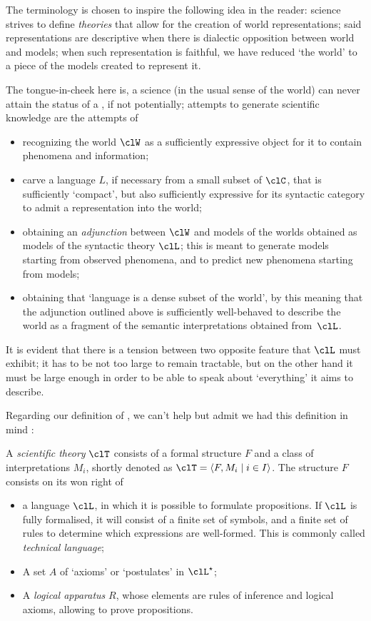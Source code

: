 \begin{remark}\label{remark_yuggoth_2}
	The terminology is chosen to inspire the following idea in the reader: science strives to define \emph{theories} that allow for the creation of world representations; said representations are descriptive when there is dialectic opposition between world and models; when such representation is faithful, we have reduced `the world' to a piece of the models created to represent it.

	The tongue-in-cheek here is, a science (in the usual sense of the world) can never attain the status of a \science, if not potentially; attempts to generate scientific knowledge are the attempts of
	\begin{itemize}
		\item recognizing the world $\clW$ as a sufficiently expressive object for it to contain phenomena and information;
		\item carve a language $L$, if necessary from a small subset of $\clC$, that is sufficiently `compact', but also sufficiently expressive for its syntactic category to admit a representation into the world;
		\item obtaining an \emph{adjunction} between $\clW$ and models of the worlds obtained as models of the syntactic theory $\clL$; this is meant to generate models starting from observed phenomena, and to predict new phenomena starting from models;
		\item obtaining that `language is a dense subset of the world', by this meaning that the adjunction outlined above is sufficiently well-behaved to describe the world as a fragment of the semantic interpretations obtained from~$\clL$.
	\end{itemize}
	It is evident that there is a tension between two opposite feature that $\clL$ must exhibit; it has to be not too large to remain tractable, but on the other hand it must be large enough in order to be able to speak about `everything' it aims to describe.
\end{remark}
Regarding our definition of \science, we can't help but admit we had this definition in mind \cite[2.1]{biologia}:
\begin{definition*}
	A \emph{scientific theory} $\clT$ consists of a formal structure $F$ and a class of interpretations $M_i$, shortly denoted as $\clT=\langle F,M_i\mid i\in I\rangle$. The structure $F$ consists on its won right of
	\begin{itemize}
		\item a language $\clL$, in which it is possible to formulate propositions. If $\clL$ is fully formalised, it will consist of a finite set of symbols, and a finite set of rules to determine which expressions are well-formed. This is commonly called \emph{technical language};
		\item A set $A$ of `axioms' or `postulates' in $\clL^\star$;
		\item A \emph{logical apparatus} $R$, whose elements are rules of inference and logical axioms, allowing to prove propositions.
	\end{itemize}
\end{definition*}
